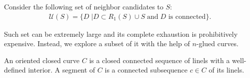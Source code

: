 \documentclass[runningheads]{llncs}
\begin{document}
Consider the following set of neighbor candidates to $S$:
\begin{align*}
\mathcal{U}(S) = \{ D \; | D \subset R_1(S) \cup S \; \text{and} \; \text{$D$ is connected} \}.
\end{align*}


Such set can be extremely large and its complete exhaustion is prohibitively expensive.  Instead, we explore a subset of it with the help of $n$-glued curves.

An oriented closed curve $C$ is a closed connected sequence of linels with a well-defined interior. A segment of $C$ is a connected subsequence $c \in C$ of its linels.

\begin{figure}
\center
	\hspace{40pt}%
	\subfloat[\label{}]{%
}
\end{figure}
\end{document}
